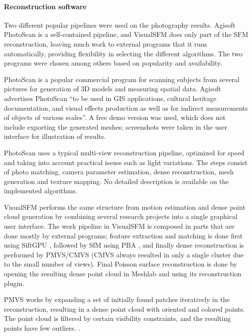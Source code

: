 \paragraph{Reconstruction software}
Two different popular pipelines were used on the photography results.
Agisoft PhotoScan is a self-contained pipeline, and VisualSFM does only part of the SFM reconstruction, leaving much work to external programs that it runs automatically, providing flexibility in selecting the different algorithms.
The two programs were chosen among others based on popularity and availability.

PhotoScan \cite{photoscan} is a popular commercial program for scanning subjects from several pictures for generation of 3D models and measuring spatial data.
Agisoft advertises PhotoScan ``to be used in GIS applications, cultural heritage documentation, and visual effects production as well as for indirect measurements of objects of various scales''. \cite{photoscan}
A free demo version was used, which does not include exporting the generated meshes; screenshots were taken in the user interface for illustration of results.

PhotoScan uses a typical multi-view reconstruction pipeline, optimized for speed and taking into account practical issues such as light variations.
The steps consist of photo matching, camera parameter estimation, dense reconstruction, mesh generation and texture mapping.
No detailed description is available on the implemented algorithms. \cite{photoscanalgorithms}

VisualSFM \cite{visualsfm} performs the same structure from motion estimation and dense point cloud generation by combining several research projects into a single graphical user interface.
The work pipeline in VisualSFM is composed in parts that are done mostly by external programs; feature extraction and matching is done first using SiftGPU \cite{chengchang2007siftcpu}, followed by SfM using PBA \cite{wu2011multicore}, and finally dense reconstruction is performed by PMVS/CMVS \cite{furukawa2010accurate,furukawa2012patch} (CMVS always resulted in only a single cluster due to the small number of views).
Final Poisson surface reconstruction is done by opening the resulting dense point cloud in Meshlab and using its reconstruction plugin. \cite{meshlab}

PMVS works by expanding a set of initially found patches iteratively in the reconstruction, resulting in a dense point cloud with oriented and colored points.
The point cloud is filtered by certain visibility constraints, and the resulting points have few outliers. \cite{furukawa2012patch}.

